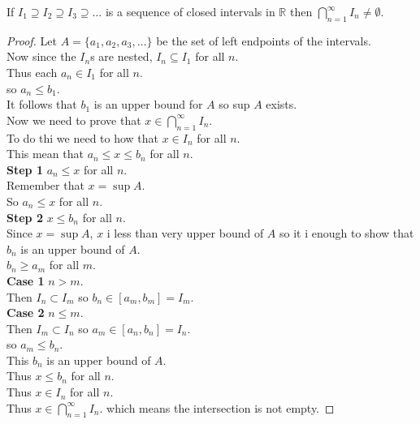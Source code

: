 \documentclass[answers,12pt,addpoints]{exam}
\begin{document}
\newpage
\begin{theorem}
    If $I_1 \supseteq I_2 \supseteq I_3 \supseteq \dots$ is a sequence of closed intervals in $\mathbb{R}$ then $\bigcap_{n=1}^{\infty} I_n \neq \emptyset$.
    \begin{proof}
        Let $A = \{a_1, a_2, a_3, \dots\}$ be the set of left endpoints of the intervals. \\
        Now since the $I_n$s are nested, $I_n \subseteq I_1$ for all $n$. \\
        Thus each $a_n \in I_1$ for all $n$. \\
        so $a_n \leq b_1.$ \\
        It follows that $b_1$ is an upper bound for $A$ so sup $A$ exists. \\
        Now we need to prove that $x \in \bigcap_{n=1}^{\infty} I_n$. \\
        To do thi we need to how that $x \in I_n$ for all $n$. \\
        This mean that $a_n \leq x \leq b_n$ for all $n$. \\
        \textbf{Step 1} $a_n \leq x$ for all $n$. \\
        Remember that $x = \sup A$. \\
        So $a_n \leq x$ for all $n$. \\
        \textbf{Step 2} $x \leq b_n$ for all $n$. \\
        Since $x = \sup A$, $x$ i less than very upper bound of $A$ so it i enough to show that $b_n$ is an upper bound of $A$. \\
        $b_n \geq a_m$ for all $m$. \\
        \textbf{Case 1} $n > m$. \\
        Then $I_n \subset I_m$ so $b_n \in [a_m, b_m] = I_m$. \\
        \textbf{Case 2} $n \leq m$. \\
        Then $I_m \subset I_n$ so $a_m \in [a_n, b_n] = I_n$. \\
        so $a_m \leq b_n$. \\
        This $b_n$ is an upper bound of $A$. \\
        Thus $x \leq b_n$ for all $n$. \\
        Thus $x \in I_n$ for all $n$. \\
        Thus $x \in \bigcap_{n=1}^{\infty} I_n$. which means the intersection is not empty.
    \end{proof}
\end{theorem}
\end{document}
